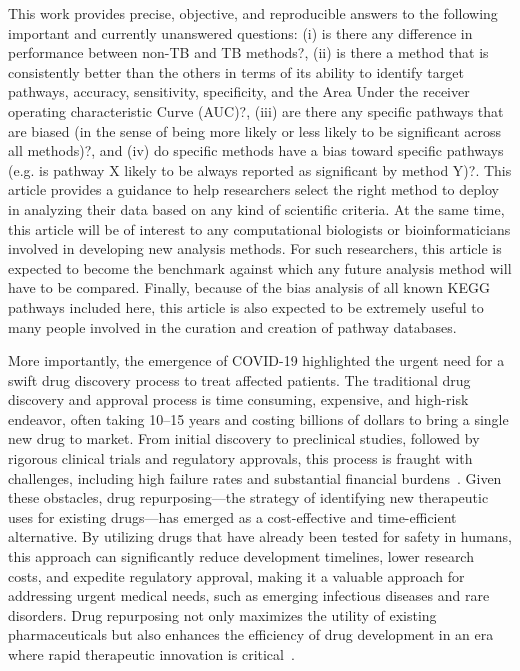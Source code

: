 This work provides precise, objective, and reproducible answers to the following important and currently unanswered questions: (i) is there any difference in performance between non-TB and TB methods?, (ii) is there a method that is consistently better than the others in terms of its ability to identify target pathways, accuracy, sensitivity, specificity, and the Area Under the receiver operating characteristic Curve (AUC)?, (iii) are there any specific pathways that are biased (in the sense of being more likely or less likely to be significant across all methods)?, and (iv) do specific methods have a bias toward specific pathways (e.g. is pathway X likely to be always reported as significant by method Y)?. 
This article provides a guidance to help researchers select the right method to deploy in analyzing their data based on any kind of scientific criteria. 
At the same time, this article will be of interest to any computational biologists or bioinformaticians involved in developing new analysis methods. 
For such researchers, this article is expected to become the benchmark against which any future analysis method will have to be compared. 
Finally, because of the bias analysis of all known KEGG pathways included here, this article is also expected to be extremely useful to many people involved in the curation and creation of pathway databases.

More importantly, the emergence of COVID-19 highlighted the urgent need for a swift drug discovery process to treat affected patients. %
The traditional drug discovery and approval process is time consuming, expensive, and high-risk endeavor, often taking 10–15 years and costing billions of dollars to bring a single new drug to market. From initial discovery to preclinical studies, followed by rigorous clinical trials and regulatory approvals, this process is fraught with challenges, including high failure rates and substantial financial burdens~\cite{adams2006estimating, dickson2009cost, dimasi2003price}.
Given these obstacles, drug repurposing—the strategy of identifying new therapeutic uses for existing drugs—has emerged as a cost-effective and time-efficient alternative. By utilizing drugs that have already been tested for safety in humans, this approach can significantly reduce development timelines, lower research costs, and expedite regulatory approval, making it a valuable approach for addressing urgent medical needs, such as emerging infectious diseases and rare disorders. Drug repurposing not only maximizes the utility of existing pharmaceuticals but also enhances the efficiency of drug development in an era where rapid therapeutic innovation is critical~\cite{chong2007new, ashburn2004drug}.

